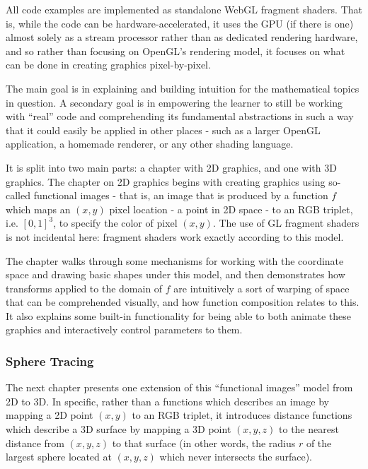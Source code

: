 \documentclass{sig-alternate-05-2015}
\begin{document}
All code examples are implemented as standalone WebGL fragment
shaders.  That is, while the code can be hardware-accelerated, it uses
the GPU (if there is one) almost solely as a stream processor rather
than as dedicated rendering hardware, and so rather than focusing on
OpenGL's rendering model, it focuses on what can be done in creating
graphics pixel-by-pixel.

The main goal is in explaining and building intuition for the
mathematical topics in question.  A secondary goal is in empowering
the learner to still be working with ``real'' code and comprehending
its fundamental abstractions in such a way that it could easily be
applied in other places - such as a larger OpenGL application, a
homemade renderer, or any other shading language.

It is split into two main parts: a chapter with 2D graphics, and one
with 3D graphics.  The chapter on 2D graphics begins with creating
graphics using so-called functional images\cite{Elliott03:FOP} - that
is, an image that is produced by a function $f$ which maps an $(x,y)$
pixel location - a point in 2D space - to an RGB triplet,
i.e. $[0,1]^3$, to specify the color of pixel $(x,y)$.  The use of GL
fragment shaders is not incidental here: fragment shaders work exactly
according to this model.

The chapter walks through some mechanisms for working with the
coordinate space and drawing basic shapes under this model, and then
demonstrates how transforms applied to the domain of $f$ are
intuitively a sort of warping of space that can be comprehended
visually, and how function composition relates to this.  It also
explains some built-in functionality for being able to both animate
these graphics and interactively control parameters to them.

\enlargethispage{-\baselineskip}
\subsubsection{Sphere Tracing}

The next chapter presents one extension of this ``functional images''
model from 2D to 3D.  In specific, rather than a functions which
describes an image by mapping a 2D point $(x,y)$ to an RGB triplet, it
introduces \textrm{distance functions} which describe a 3D surface by
mapping a 3D point $(x,y,z)$ to the nearest distance from $(x,y,z)$ to
that surface (in other words, the radius $r$ of the largest sphere
located at $(x,y,z)$ which never intersects the surface).
\end{document}
